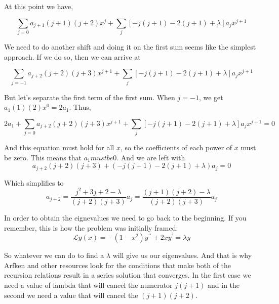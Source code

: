 At this point we have,

$$
\sum_{j=0} a_{j+1} (j+1)(j+2) x^{j}
    + \sum_j \left[ -j(j+1) -2(j+1) + \lambda \right] a_j x^{j+1}
$$

We need to do another shift and doing it on the first sum seems like the simplest approach.
If we do so, then we can arrive at

$$
\sum_{j=-1} a_{j+2} (j+2)(j+3) x^{j+1}
    + \sum_j \left[ -j(j+1) -2(j+1) + \lambda \right] a_j x^{j+1}
$$

But let's separate the first term of the first sum.
When $j=-1$, we get $a_1 (1)(2) x^0 = 2a_1$.
Thus,

$$
2 a_1 +
    \sum_{j=0} a_{j+2} (j+2)(j+3) x^{j+1}
    + \sum_j \left[ -j(j+1) -2(j+1) + \lambda \right] a_j x^{j+1} = 0
$$

And this equation must hold for all $x$, so the coefficients of each power of $x$ must be zero.
This means that $a_1 must be 0$.
And we are left with
$$
a_{j+2} (j+2)(j+3)
    + \left( -j(j+1) -2(j+1) + \lambda \right) a_j = 0
$$

Which simplifies to
$$
a_{j+2} = \frac{ j^2 + 3j + 2 - \lambda }{ (j+2)(j+3) } a_j
= \frac{ (j+1)(j+2) - \lambda }{ (j+2)(j+3) } a_j
$$

In order to obtain the eignevalues we need to go back to the beginning.
If you remember, this is how the problem was initially framed:
$$
\mathcal{L} y(x) =
-(1-x^2) y^{\prime\prime} + 2x y^\prime = \lambda y
$$

So whatever we can do to find a $\lambda$ will give us our eigenvalues.
And that is why Arfken and other resources look for the conditions that make both of the recursion relations result in
a series solution that converges.
In the first case we need a value of lambda that will cancel the numerator $j(j+1)$ and in the second we need a value that
will cancel the $(j+1)(j+2)$.
